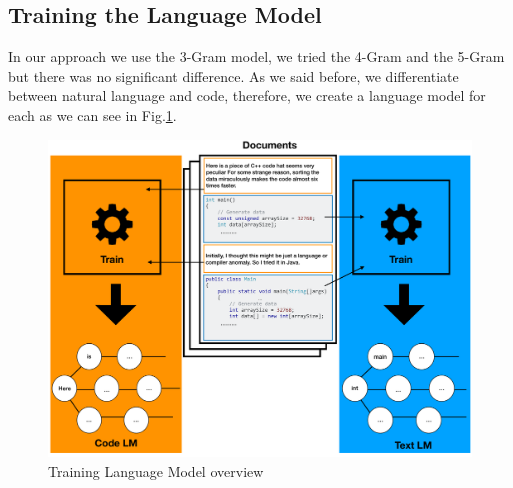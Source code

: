 \documentclass[12pt,mscthesis]{usiinfthesis}
\begin{document}
	\subsection{Training the Language Model}
	In our approach we use the 3-Gram model, we tried the 4-Gram and the 5-Gram but there was no significant difference. As we said before, we differentiate between natural language and code, therefore, we create a language model for each as we can see in Fig.\ref{trainingLm}.\\

	\begin{figure}[H]
	\centering
	\includegraphics[width=\textwidth]{trainingLm}
	\caption{Training Language Model overview}
	\label{trainingLm}
	\end{figure}
\end{document}
